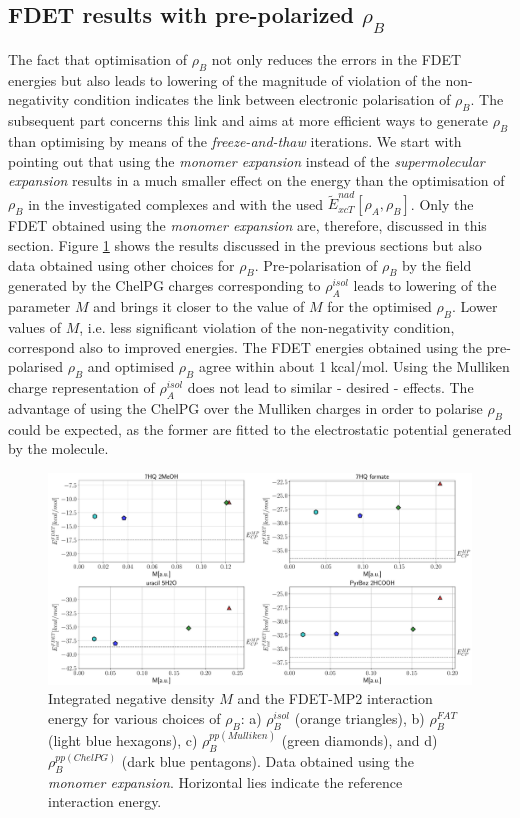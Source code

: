 \documentclass[amsmath,amssymb,preprint,aip,jcp]{revtex4-1}
\begin{document}
\subsection{FDET results with pre-polarized $\rho_B$}
The fact that optimisation of $\rho_B$ not only reduces the errors in the FDET energies but also leads to lowering of the magnitude of violation of the non-negativity condition indicates the link between electronic polarisation of $\rho_B$. 
The subsequent part concerns this link and aims at more efficient ways to generate $\rho_B$ than optimising by means of the {\it freeze-and-thaw} iterations. 
We start with pointing out that using the {\it monomer expansion} instead of the {\it supermolecular expansion} results in a much smaller effect on the energy than the optimisation of $\rho_B$ in the investigated complexes and with the used $\tilde{E}_{xcT}^{nad}[\rho_A,\rho_B]$. 
Only the FDET obtained using the {\it monomer expansion} are, therefore, discussed in this section.
Figure \ref{fig:M_vs_MP} shows the results discussed in the previous sections but also data obtained using other choices for $\rho_B$.
Pre-polarisation of $\rho_B$ by the field generated by the ChelPG charges corresponding to $\rho_A^{isol}$ leads to lowering of the parameter $M$ and brings it closer to the value of $M$ for the optimised $\rho_B$. 
Lower values of $M$, i.e. less significant violation of the non-negativity condition, correspond also to improved energies. 
The FDET energies obtained using the pre-polarised $\rho_B$ and optimised $\rho_B$ agree within about 1 kcal/mol.
Using the Mulliken charge representation of $\rho_A^{isol}$ does not lead to similar - desired - effects. 
The advantage of using the ChelPG over the Mulliken charges in order to polarise $\rho_B$ could be expected, as the former are fitted to the electrostatic potential generated by the molecule.
\begin{figure}
\centering
\includegraphics[width=1.0\linewidth]{M_vs_MP.pdf}
\caption{Integrated negative density $M$ and the FDET-MP2 interaction energy for various choices of $\rho_B$: a) $\rho_B^{isol}$ (orange triangles), b) $\rho_B^{FAT}$ (light blue hexagons), c) $\rho_B^{pp(Mulliken)}$ (green diamonds), and d) $\rho_B^{pp(ChelPG)}$ (dark blue pentagons). Data obtained using the {\it monomer expansion}. Horizontal lies indicate the reference interaction energy.}
\label{fig:M_vs_MP}
\end{figure}
\end{document}
